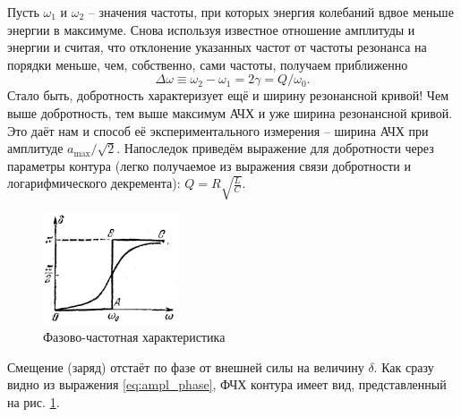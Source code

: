 \documentclass{../lab_class}
\begin{document}
Пусть $\omega_1$ и $\omega_2$ -- значения частоты, при которых энергия колебаний вдвое меньше энергии в максимуме. Снова используя известное отношение амплитуды и энергии и считая, что отклонение указанных частот от частоты резонанса на порядки меньше, чем, собственно, сами частоты, получаем приближенно
\begin{equation*}
	\Delta \omega \equiv \omega_2 - \omega_1 = 2 \gamma = Q / \omega_0.
\end{equation*}
Стало быть, добротность характеризует ещё и ширину резонансной кривой! Чем выше добротность, тем выше максимум АЧХ и уже ширина резонансной кривой. Это даёт нам и способ её экспериментального измерения -- ширина АЧХ при амплитуде $a_{\max}/\sqrt{2}$. Напоследок приведём выражение для добротности через параметры контура (легко получаемое из выражения связи добротности и логарифмического декремента): $Q = R \sqrt{\frac{L}{C}}$.

\begin{figure}
	\centering
	\includegraphics[width=4cm]{freq_curve.png}
	\caption{Фазово-частотная характеристика}
	\label{fig:phase_resp}
\end{figure}

Смещение (заряд) отстаёт по фазе от внешней силы на величину $\delta$. Как сразу видно из выражения \ref{eq:ampl_phase}, ФЧХ контура имеет вид, представленный на рис. \ref{fig:phase_resp}.
\end{document}
